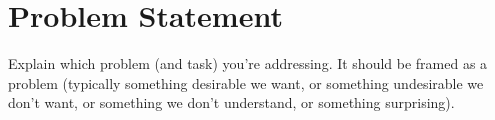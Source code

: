 \section*{Problem Statement}

Explain which problem (and task) you're addressing.
It should be framed as a problem (typically something desirable we want, or something undesirable we don't want, or something we don't understand, or something surprising).

\cite{pykeen}
